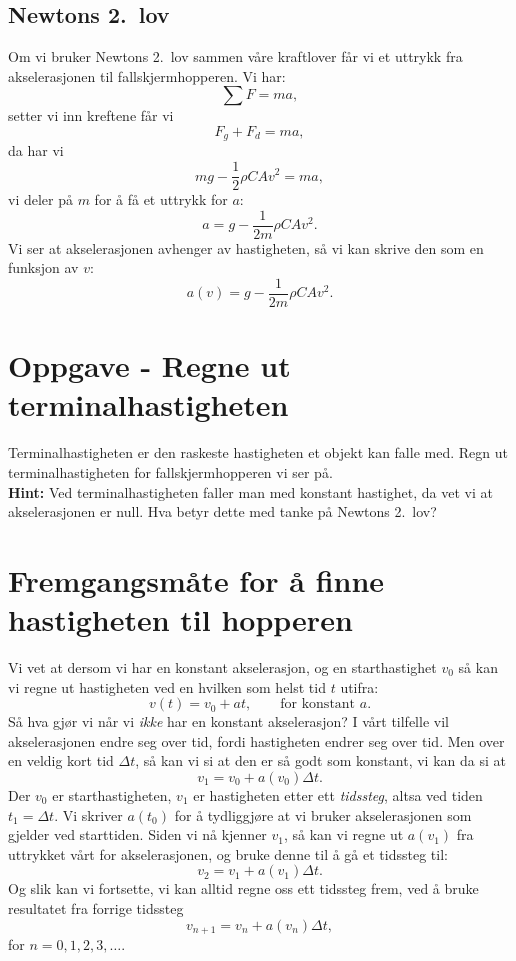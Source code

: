\documentclass[a4paper, 11pt, notitlepage]{article}
\begin{document}
\subsection*{Newtons 2.\ lov}

Om vi bruker Newtons 2.\ lov sammen våre kraftlover får vi et uttrykk fra akselerasjonen til fallskjermhopperen. Vi har:
$$\sum F = ma,$$
setter vi inn kreftene får vi
$$F_g + F_d = ma,$$
da har vi
$$mg - \frac{1}{2}\rho C A v^2 = ma,$$
vi deler på $m$ for å få et uttrykk for $a$:
$$a = g - \frac{1}{2m}\rho C A v^2.$$
Vi ser at akselerasjonen avhenger av hastigheten, så vi kan skrive den som en funksjon av $v$:
$$a(v) = g - \frac{1}{2m}\rho C A v^2.$$

\section*{Oppgave - Regne ut terminalhastigheten}
Terminalhastigheten er den raskeste hastigheten et objekt kan falle med. Regn ut terminalhastigheten for fallskjermhopperen vi ser på. \\ 
\textbf{Hint:} Ved terminalhastigheten faller man med konstant hastighet, da vet vi at akselerasjonen er null. Hva betyr dette med tanke på Newtons 2.\ lov?

\clearpage

\section*{Fremgangsmåte for å finne hastigheten til hopperen}
Vi vet at dersom vi har en konstant akselerasjon, og en starthastighet $v_0$ så kan vi regne ut hastigheten ved en hvilken som helst tid $t$ utifra:
$$v(t) = v_0 + at, \qquad \mbox{for konstant } a.$$
Så hva gjør vi når vi \emph{ikke} har en konstant akselerasjon? I vårt tilfelle vil akselerasjonen endre seg over tid, fordi hastigheten endrer seg over tid. Men over en veldig kort tid $\Delta t$, så kan vi si at den er så godt som konstant, vi kan da si at
$$v_1 = v_0 + a(v_0) \Delta t.$$
Der $v_0$ er starthastigheten, $v_1$ er hastigheten etter ett \emph{tidssteg}, 
altsa ved tiden $t_1 = \Delta t$.
Vi skriver $a(t_0)$ for å tydliggjøre at vi bruker akselerasjonen som gjelder
 ved starttiden. Siden vi nå kjenner $v_1$, så kan vi regne ut $a(v_1)$ fra uttrykket vårt for akselerasjonen, og bruke denne til å gå et tidssteg til:
$$v_2 = v_1 + a(v_1) \Delta t.$$
Og slik kan vi fortsette, vi kan alltid regne oss ett tidssteg frem, ved å bruke resultatet fra forrige tidssteg
$$v_{n+1} = v_n + a(v_n)\Delta t,$$
for $n=0,1,2,3,\ldots$.
\end{document}

